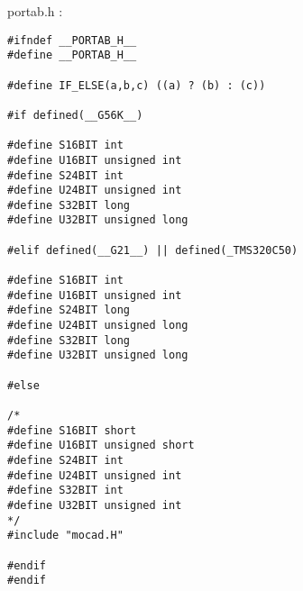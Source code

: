 portab.h :

\begin{verbatim}
#ifndef __PORTAB_H__
#define __PORTAB_H__

#define IF_ELSE(a,b,c) ((a) ? (b) : (c))

#if defined(__G56K__)

#define S16BIT int
#define U16BIT unsigned int
#define S24BIT int
#define U24BIT unsigned int
#define S32BIT long
#define U32BIT unsigned long

#elif defined(__G21__) || defined(_TMS320C50)

#define S16BIT int
#define U16BIT unsigned int
#define S24BIT long
#define U24BIT unsigned long
#define S32BIT long
#define U32BIT unsigned long

#else

/*
#define S16BIT short
#define U16BIT unsigned short
#define S24BIT int
#define U24BIT unsigned int
#define S32BIT int
#define U32BIT unsigned int
*/
#include "mocad.H"

#endif
#endif
\end{verbatim}

